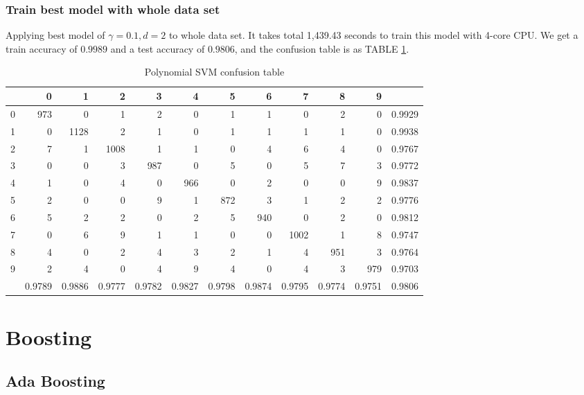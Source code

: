 \documentclass[conference]{IEEEtran}
\begin{document}
\subsubsection{Train best model with whole data set}
Applying best model of $\gamma=0.1,d=2$ to whole data set. It takes total 1,439.43 seconds to train this model with 4-core CPU. We get a train accuracy of $0.9989$ and a test accuracy of $0.9806$, and the confusion table is as TABLE \ref{tab:Polynomial SVM confusion table}.
\begin{table}[htbp]
\tiny
  \centering
  \caption{Polynomial SVM confusion table}
\begin{tabular}{|r|rrrrrrrrrr|r|}
\hline
  & 0 & 1 & 2 & 3 & 4 & 5 & 6 & 7 & 8 & 9 &  \\
\hline
0 & 973 & 0 & 1 & 2 & 0 & 1 & 1 & 0 & 2 & 0 & 0.9929 \\
1 & 0 & 1128 & 2 & 1 & 0 & 1 & 1 & 1 & 1 & 0 & 0.9938 \\
2 & 7 & 1 & 1008 & 1 & 1 & 0 & 4 & 6 & 4 & 0 & 0.9767 \\
3 & 0 & 0 & 3 & 987 & 0 & 5 & 0 & 5 & 7 & 3 & 0.9772 \\
4 & 1 & 0 & 4 & 0 & 966 & 0 & 2 & 0 & 0 & 9 & 0.9837 \\
5 & 2 & 0 & 0 & 9 & 1 & 872 & 3 & 1 & 2 & 2 & 0.9776 \\
6 & 5 & 2 & 2 & 0 & 2 & 5 & 940 & 0 & 2 & 0 & 0.9812 \\
7 & 0 & 6 & 9 & 1 & 1 & 0 & 0 & 1002 & 1 & 8 & 0.9747 \\
8 & 4 & 0 & 2 & 4 & 3 & 2 & 1 & 4 & 951 & 3 & 0.9764 \\
9 & 2 & 4 & 0 & 4 & 9 & 4 & 0 & 4 & 3 & 979 & 0.9703 \\
\hline
  & 0.9789 & 0.9886 & 0.9777 & 0.9782 & 0.9827 & 0.9798 & 0.9874 & 0.9795 & 0.9774 & 0.9751 & 0.9806 \\
\hline
\end{tabular}%
  \label{tab:Polynomial SVM confusion table}%
\end{table}%


\section{Boosting}
\subsection{Ada Boosting}
\end{document}
